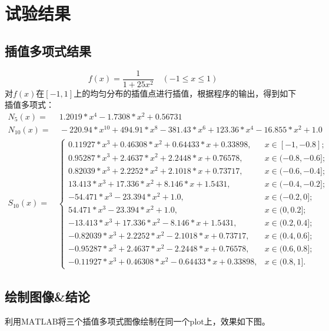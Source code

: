\documentclass[12pt, a4paper, oneside]{ctexart}
\begin{document}
\section{试验结果}
\subsection{插值多项式结果}
\begin{equation*}
    f(x) = \frac{1}{1+25x^2}\quad (-1\leqslant x\leqslant 1)
\end{equation*}
对$f(x)$在$[-1,1]$上的均匀分布的插值点进行插值，根据程序的输出，得到如下插值多项式：
\begin{equation*}
    \begin{aligned}
        N_5(x) =&\ 1.2019*x^4 - 1.7308*x^2 + 0.56731\\
        N_{10}(x) =&\  - 220.94*x^{10} + 494.91*x^8 - 381.43*x^6 + 123.36*x^4 - 16.855*x^2 + 1.0\\
        S_{10}(x) =& \begin{cases}
            0.11927*x^3 + 0.46308*x^2 + 0.64433*x + 0.33898,&x\in[-1,-0.8];\\
            0.95287*x^3 + 2.4637*x^2 + 2.2448*x + 0.76578,&x\in(-0.8,-0.6];\\
            0.82039*x^3 + 2.2252*x^2 + 2.1018*x + 0.73717,&x\in(-0.6,-0.4];\\
            13.413*x^3 + 17.336*x^2 + 8.146*x + 1.5431,&x\in(-0.4,-0.2];\\
            - 54.471*x^3 - 23.394*x^2  + 1.0,&x\in(-0.2,0];\\
            54.471*x^3 - 23.394*x^2  + 1.0,&x\in(0,0.2];\\
            - 13.413*x^3 + 17.336*x^2 - 8.146*x + 1.5431,&x\in(0.2,0.4];\\
            - 0.82039*x^3 + 2.2252*x^2 - 2.1018*x + 0.73717,&x\in(0.4,0.6];\\
            - 0.95287*x^3 + 2.4637*x^2 - 2.2448*x + 0.76578,&x\in(0.6,0.8];\\
            - 0.11927*x^3 + 0.46308*x^2 - 0.64433*x + 0.33898,&x\in(0.8,1].
        \end{cases}
    \end{aligned}
\end{equation*}
\subsection{绘制图像\&结论}
利用$\text{MATLAB}$将三个插值多项式图像绘制在同一个$\text{plot}$上，效果如下图。
\end{document}

